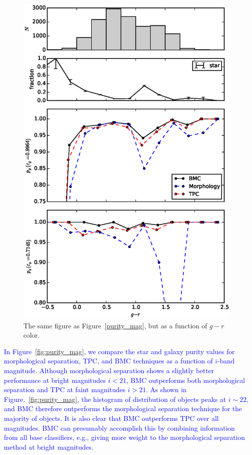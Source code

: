 \documentclass[useAMS,usenatbib]{mn2e}
\newcommand{\eg}{{e.g., }}
\begin{document}
\begin{figure}
  \centering
  \includegraphics[width=\linewidth]{figures/purity_g-r.eps}
  \caption{The same figure as Figure~\ref{purity_mag},
           but as a function of $g-r$ color.}
  \label{fig:purity_g-r}
\end{figure}

\textcolor{blue}{In Figure~\ref{fig:purity_mag}, 
we compare the star and galaxy purity values
for morphological separation, TPC, and BMC techniques
as a function of $i$-band magnitude.
Although morphological separation shows a slightly better performance
at bright magnitudes $i < 21$,
BMC outperforms both morphological separation and TPC
at faint magnitudes $i > 21$.
As shown in Figure.~\ref{fig:purity_mag},
the histogram of distribution of objects peaks at $i \sim 22$,
and BMC therefore outperforms the morphological separation technique
for the majority of objects.
It is also clear that BMC outperforms TPC over all magnitudes.
BMC can presumably accomplish this by combining information from
all base classifiers,
\eg giving more weight to the morphological separation method
at bright magnitudes.}
\end{document}
